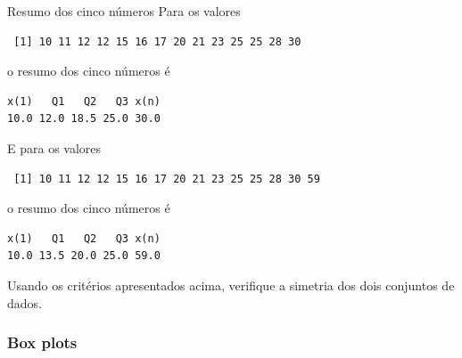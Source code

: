 \documentclass[10pt]{beamer}\usepackage[]{graphicx}\usepackage[]{color}
\makeatletter
\newenvironment{kframe}{%
 \def\at@end@of@kframe{}%
 \ifinner\ifhmode%
  \def\at@end@of@kframe{\end{minipage}}%
  \begin{minipage}{\columnwidth}%
 \fi\fi%
 \def\FrameCommand##1{\hskip\@totalleftmargin \hskip-\fboxsep
 \colorbox{shadecolor}{##1}\hskip-\fboxsep
     \hskip-\linewidth \hskip-\@totalleftmargin \hskip\columnwidth}%
 \MakeFramed {\advance\hsize-\width
   \@totalleftmargin\z@ \linewidth\hsize
   \@setminipage}}%
 {\par\unskip\endMakeFramed%
 \at@end@of@kframe}
\newenvironment{knitrout}{}{} %
\theoremstyle{definition}
\makeatother
\begin{document}
\begin{frame}[fragile]{Resumo dos cinco números}
  Para os valores
\begin{knitrout}\footnotesize
{}\color{fgcolor}\begin{kframe}
\begin{verbatim}
 [1] 10 11 12 12 15 16 17 20 21 23 25 25 28 30
\end{verbatim}
\end{kframe}
\end{knitrout}
o resumo dos cinco números é
\begin{knitrout}\footnotesize
{}\color{fgcolor}\begin{kframe}
\begin{verbatim}
x(1)   Q1   Q2   Q3 x(n) 
10.0 12.0 18.5 25.0 30.0 
\end{verbatim}
\end{kframe}
\end{knitrout}
E para os valores
\begin{knitrout}\footnotesize
{}\color{fgcolor}\begin{kframe}
\begin{verbatim}
 [1] 10 11 12 12 15 16 17 20 21 23 25 25 28 30 59
\end{verbatim}
\end{kframe}
\end{knitrout}
o resumo dos cinco números é
\begin{knitrout}\footnotesize
{}\color{fgcolor}\begin{kframe}
\begin{verbatim}
x(1)   Q1   Q2   Q3 x(n) 
10.0 13.5 20.0 25.0 59.0 
\end{verbatim}
\end{kframe}
\end{knitrout}
Usando os critérios apresentados acima, verifique a simetria dos dois
conjuntos de dados.
\end{frame}

\subsubsection{Box plots}
\end{document}
